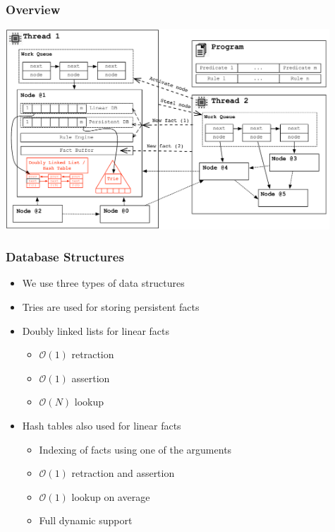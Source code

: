 \documentclass{beamer}
\begin{document}
\begin{frame}[fragile]
   \frametitle{Overview}
   \includegraphics[height=7.5cm]{overview4.pdf}
\end{frame}

\begin{frame}[fragile]
   \frametitle{Database Structures}
   \begin{itemize}
      \item We use three types of data structures
      \item Tries are used for storing persistent facts
      \item Doubly linked lists for linear facts
      \begin{itemize}
         \item $\mathcal{O}(1)$ retraction
         \item $\mathcal{O}(1)$ assertion
         \item $\mathcal{O}(N)$ lookup
      \end{itemize}
      \item Hash tables also used for linear facts
      \begin{itemize}
         \item Indexing of facts using one of the arguments
         \item $\mathcal{O}(1)$ retraction and assertion
         \item $\mathcal{O}(1)$ lookup on average
         \item Full dynamic support
      \end{itemize}
   \end{itemize}
\end{frame}
\end{document}
